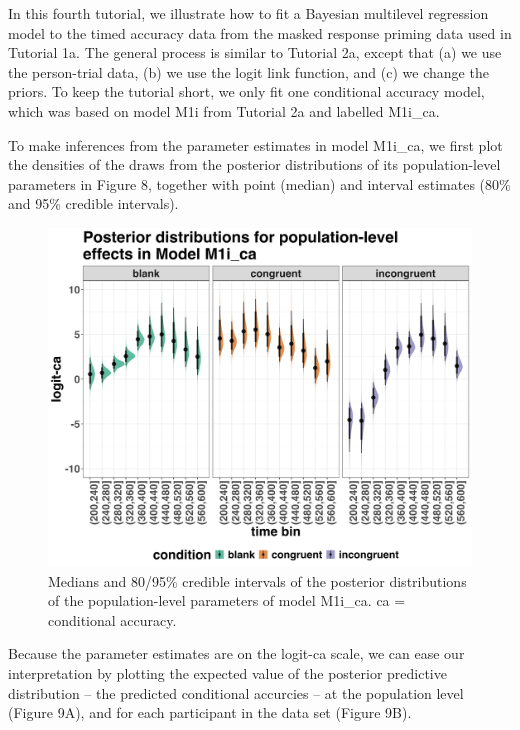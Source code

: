 \documentclass[
  man, donotrepeattitle,floatsintext]{apa6}
\begin{document}
In this fourth tutorial, we illustrate how to fit a Bayesian multilevel regression model to the timed accuracy data from the masked response priming data used in Tutorial 1a. The general process is similar to Tutorial 2a, except that (a) we use the person-trial data, (b) we use the logit link function, and (c) we change the priors. To keep the tutorial short, we only fit one conditional accuracy model, which was based on model M1i from Tutorial 2a and labelled M1i\_ca.

To make inferences from the parameter estimates in model M1i\_ca, we first plot the densities of the draws from the posterior distributions of its population-level parameters in Figure 8, together with point (median) and interval estimates (80\% and 95\% credible intervals).



\begin{figure}[H]

{\centering \includegraphics[width=0.8\linewidth,height=0.67\textheight,]{../Tutorial_2_Bayesian/figures/M1i_ca_postdistr} 

}

\caption{Medians and 80/95\% credible intervals of the posterior distributions of the population-level parameters of model M1i\_ca. ca = conditional accuracy.}\label{fig:plot-ca-fixed-effects}
\end{figure}

Because the parameter estimates are on the logit-ca scale, we can ease our interpretation by plotting the expected value of the posterior predictive distribution -- the predicted conditional accurcies -- at the population level (Figure 9A), and for each participant in the data set (Figure 9B).
\end{document}
